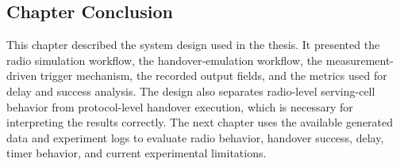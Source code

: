 \subsection{Chapter Conclusion}

This chapter described the system design used in the thesis. It presented the radio simulation workflow, the handover-emulation workflow, the measurement-driven trigger mechanism, the recorded output fields, and the metrics used for delay and success analysis. The design also separates radio-level serving-cell behavior from protocol-level handover execution, which is necessary for interpreting the results correctly. The next chapter uses the available generated data and experiment logs to evaluate radio behavior, handover success, delay, timer behavior, and current experimental limitations.
